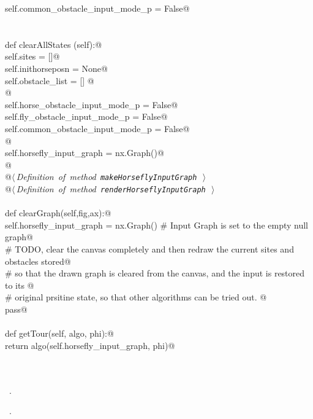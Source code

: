 \documentclass[11.5pt]{report}
\begin{document}
\begin{flushleft}
\begin{list}{}{}
\mbox{}\verb@           self.common_obstacle_input_mode_p = False@\\
\mbox{}\verb@@\\
\mbox{}\verb@@\\
\mbox{}\verb@      def clearAllStates (self):@\\
\mbox{}\verb@          self.sites           = []@\\
\mbox{}\verb@          self.inithorseposn   = None@\\
\mbox{}\verb@          self.obstacle_list = [] @\\
\mbox{}\verb@   @\\
\mbox{}\verb@          self.horse_obstacle_input_mode_p  = False@\\
\mbox{}\verb@          self.fly_obstacle_input_mode_p    = False@\\
\mbox{}\verb@          self.common_obstacle_input_mode_p = False@\\
\mbox{}\verb@    @\\
\mbox{}\verb@          self.horsefly_input_graph = nx.Graph()@\\
\mbox{}\verb@      @\\
\mbox{}\verb@      @\hbox{$\langle\,${\itshape Definition of method \verb|makeHorseflyInputGraph|}\nobreak\ {\footnotesize {}}$\,\rangle$}\verb@@\\
\mbox{}\verb@      @\hbox{$\langle\,${\itshape Definition of method \verb|renderHorseflyInputGraph|}\nobreak\ {\footnotesize {}}$\,\rangle$}\verb@@\\
\mbox{}\verb@@\\
\mbox{}\verb@      def clearGraph(self,fig,ax):@\\
\mbox{}\verb@          self.horsefly_input_graph = nx.Graph() # Input Graph is set to the empty null graph@\\
\mbox{}\verb@          # TODO, clear the canvas completely and then redraw the current sites and obstacles stored@\\
\mbox{}\verb@          # so that the drawn graph is cleared from the canvas, and the input is restored to its @\\
\mbox{}\verb@          # original prsitine state, so that other algorithms can be tried out. @\\
\mbox{}\verb@          pass@\\
\mbox{}\verb@@\\
\mbox{}\verb@      def getTour(self, algo, phi):@\\
\mbox{}\verb@             return algo(self.horsefly_input_graph, phi)@\\
\mbox{}\verb@@\\
\mbox{}\verb@@\\
\mbox{}\verb@@{\NWsep}
\end{list}
\vspace{-1.5ex}
\footnotesize
\begin{list}{}{\setlength{\itemsep}{-\parsep}\setlength{\itemindent}{-\leftmargin}}
\item \NWtxtMacroDefBy\ .
\item \NWtxtMacroRefIn\ .


\end{list}
\end{flushleft}
\end{document}
